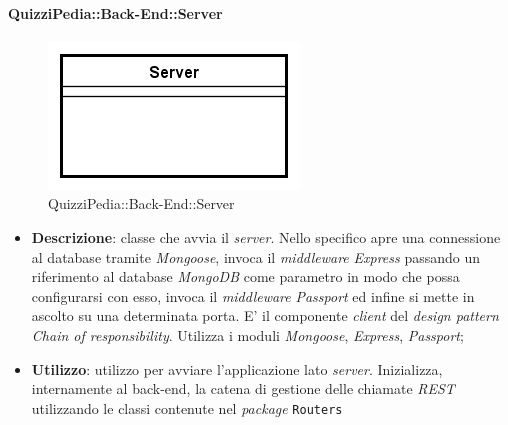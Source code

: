 	\paragraph{QuizziPedia::Back-End::Server}
\label{QuizziPedia::Back-End::Server}
\begin{figure}[ht]
	\centering
	\includegraphics[scale=0.45]{UML/Classi/Back-End/QuizziPedia_Back-End_Server.png}
	\caption{QuizziPedia::Back-End::Server}
\end{figure}
\FloatBarrier
	\begin{itemize}
		\item \textbf{Descrizione}:
		classe che avvia il \textit{server}. Nello specifico apre una connessione al database tramite \textit{Mongoose}, invoca il \textit{middleware} \textit{Express} passando un riferimento al database \textit{MongoDB} come parametro in modo  che possa configurarsi con esso, invoca il \textit{middleware} \textit{Passport} ed infine si mette in ascolto su una determinata porta. E' il componente \textit{client} del \textit{design pattern} \textit{Chain of responsibility}. Utilizza i moduli \textit{Mongoose}, \textit{Express}, \textit{Passport};
		\item \textbf{Utilizzo}:
		utilizzo per avviare l'applicazione lato \textit{server}. Inizializza, internamente al back-end, la catena di gestione delle chiamate \textit{REST} utilizzando le classi contenute nel \textit{package} \texttt{Routers}
	\end{itemize}
	